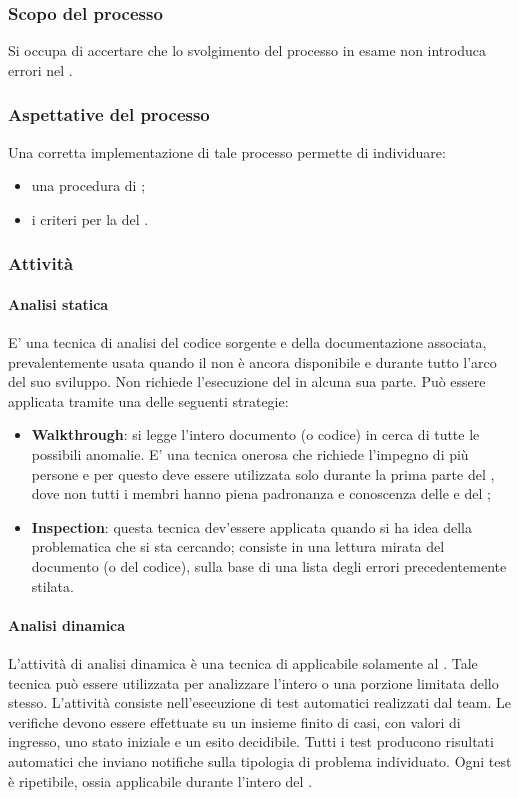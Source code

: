 \subsubsection{Scopo del processo}
Si occupa di accertare che lo svolgimento del processo in esame non introduca errori nel .
\subsubsection{Aspettative del processo}
Una corretta implementazione di tale processo permette di individuare:
\begin{itemize}
	\item una procedura di ;
	\item i criteri per la  del .
\end{itemize}
\subsubsection{Attività}
\paragraph{Analisi statica}
E' una tecnica di analisi del codice sorgente e della documentazione associata, prevalentemente
usata quando il  non è ancora disponibile e durante tutto l'arco del suo sviluppo. Non
richiede l'esecuzione del   in alcuna sua parte. Può essere applicata tramite una
delle seguenti strategie:
\begin{itemize}
	\item \textbf{Walkthrough}: si legge l'intero documento (o codice) in cerca di tutte le possibili anomalie. E' una tecnica onerosa che richiede l'impegno di più persone e per questo deve essere utilizzata solo durante la prima parte del , dove non tutti i membri hanno piena padronanza e conoscenza delle \NPdoc e del \PQdoc;
	\item \textbf{Inspection}: questa tecnica dev'essere applicata quando si ha idea della
	problematica che si sta cercando; consiste in una lettura mirata del
	documento (o del codice), sulla base di una lista degli errori precedentemente
	stilata.
\end{itemize}
\paragraph{Analisi dinamica}
L'attività di analisi dinamica è una tecnica di  applicabile solamente al . Tale tecnica può essere utilizzata per analizzare l'intero  o una
porzione limitata dello stesso. L'attività consiste nell'esecuzione di test automatici realizzati
dal team. Le verifiche devono essere effettuate su un insieme finito di casi, con valori di
ingresso, uno stato iniziale e un esito decidibile. Tutti i test producono risultati automatici
che inviano notifiche sulla tipologia di problema individuato. Ogni test è ripetibile, ossia
applicabile durante l'intero  del .
